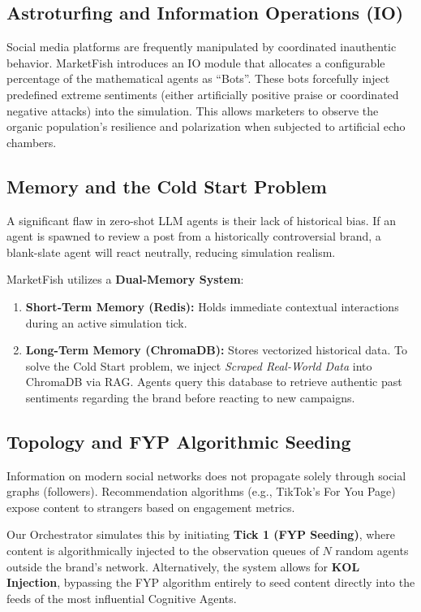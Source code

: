 \documentclass[conference]{IEEEtran}
\begin{document}
\subsection{Astroturfing and Information Operations (IO)}
Social media platforms are frequently manipulated by coordinated inauthentic behavior. MarketFish introduces an IO module that allocates a configurable percentage of the mathematical agents as ``Bots''. These bots forcefully inject predefined extreme sentiments (either artificially positive praise or coordinated negative attacks) into the simulation. This allows marketers to observe the organic population's resilience and polarization when subjected to artificial echo chambers.

\subsection{Memory and the Cold Start Problem}
A significant flaw in zero-shot LLM agents is their lack of historical bias. If an agent is spawned to review a post from a historically controversial brand, a blank-slate agent will react neutrally, reducing simulation realism.

MarketFish utilizes a \textbf{Dual-Memory System}:
\begin{enumerate}
    \item \textbf{Short-Term Memory (Redis):} Holds immediate contextual interactions during an active simulation tick.
    \item \textbf{Long-Term Memory (ChromaDB):} Stores vectorized historical data. To solve the Cold Start problem, we inject \textit{Scraped Real-World Data} into ChromaDB via RAG. Agents query this database to retrieve authentic past sentiments regarding the brand before reacting to new campaigns.
\end{enumerate}

\subsection{Topology and FYP Algorithmic Seeding}
Information on modern social networks does not propagate solely through social graphs (followers). Recommendation algorithms (e.g., TikTok's For You Page) expose content to strangers based on engagement metrics. 

Our Orchestrator simulates this by initiating \textbf{Tick 1 (FYP Seeding)}, where content is algorithmically injected to the observation queues of $N$ random agents outside the brand's network. Alternatively, the system allows for \textbf{KOL Injection}, bypassing the FYP algorithm entirely to seed content directly into the feeds of the most influential Cognitive Agents.
\end{document}
